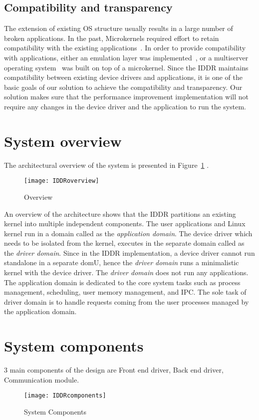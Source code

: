 \subsection{Compatibility and transparency} 
The extension of existing OS structure usually results in a large number of broken applications. In the past, Microkernels required effort to retain compatibility with the existing applications~\cite{Heiser06arevirtualmachine}. In order to provide compatibility with applications, either an emulation layer was implemented~\cite{Heiser06arevirtualmachine}, or a multiserver operating system~\cite{Gefflaut00thesawmill, Tanenbaum06canwe} was built on top of a microkernel. Since the IDDR maintains compatibility between existing device drivers and applications, it is one of the basic goals of our solution to achieve the compatibility and transparency. Our solution makes sure that the performance improvement implementation will not require any changes in the device driver and the application to run the system.

\pagebreak

\section{System overview}\label{overview}
The architectural overview of the system is presented in Figure~\ref{fig:overview} .
\begin{figure}[!ht]
\centering
\texttt{[image: IDDRoverview]}
\caption{Overview}
\label{fig:overview}
\end{figure}
An overview of the architecture shows that the IDDR partitions an existing kernel into multiple independent components. The user applications and Linux kernel run in a domain called as the \textit{application domain}. The device driver which needs to be isolated from the kernel, executes in the separate domain called as the \textit{driver domain}. Since in the IDDR implementation, a device driver cannot run standalone in a separate domU, hence the \textit{driver domain} runs a minimalistic kernel with the device driver. The \textit{driver domain} does not run any applications. The application domain is dedicated to the core system tasks such as process management, scheduling, user memory management, and IPC. The sole task of driver domain is to handle requests coming from the user processes managed by the application domain.
\pagebreak

\section{System components}\label{components}
3 main components of the design are Front end driver, Back end driver, Communication module.
\begin{figure}[!ht]
\centering
\texttt{[image: IDDRcomponents]}
\caption{System Components}
\label{fig:Design Evo1}
\end{figure}

